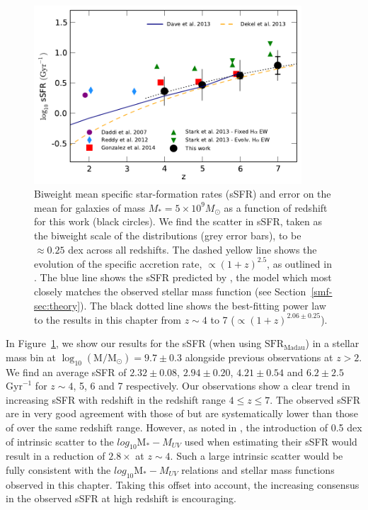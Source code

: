 \begin{figure}
\centering
\includegraphics[width=100mm]{plots/fig13.pdf}
\caption[Biweight mean specific star-formation rates (sSFR) and error on the mean for galaxies of mass $M_{*} = 5 \times 10^9 M_{\odot}$ as a function of redshift for this work (black circles).]{Biweight mean specific star-formation rates (sSFR) and error on the mean for galaxies of mass $M_{*} = 5 \times 10^9 M_{\odot}$ as a function of redshift for this work (black circles). We find the scatter in sSFR, taken as the biweight scale of the distributions (grey error bars), to be $\approx 0.25$ dex across all redshifts. The dashed yellow line shows the evolution of the specific accretion rate, $\propto (1 + z)^{2.5}$, as outlined in \citet{Dekel:2013id}. The blue line shows the sSFR predicted by \citet{Dave:2013bf}, the model which most closely matches the observed stellar mass function (see Section~\ref{smf-sec:theory}). The black dotted line shows the best-fitting power law to the results in this chapter from $z \sim 4$ to 7 ($\propto (1 + z)^{2.06 \pm 0.25}$).}
\label{smf-fig:ssfr_evolution}
\end{figure}

In Figure~\ref{smf-fig:ssfr_evolution}, we show our results for the sSFR (when using $\text{SFR}_{\text{Madau}}$) in a stellar mass bin at $\log_{10}(\text{M} / \text{M}_{\odot}) = 9.7 \pm 0.3$ alongside previous observations at $z > 2$. We find an average sSFR of $2.32\pm0.08$, $2.94\pm0.20$, $4.21\pm0.54$ and $6.2\pm2.5$ $\text{Gyr}^{-1}$ for $z\sim 4$, 5, 6 and 7 respectively. Our observations show a clear trend in increasing sSFR with redshift in the redshift range $4 \leq z \leq 7$. The observed sSFR are in very good agreement with those of \citet{2014ApJ...781...34G} but are systematically lower than those of \citet{Stark:2013ix} over the same redshift range. However, as noted in \citet{Stark:2013ix}, the introduction of 0.5 dex of intrinsic scatter to the $log_{10}\text{M}_{*}-M_{UV}$ used when estimating their sSFR would result in a reduction of $2.8\times$ at $z\sim4$. Such a large intrinsic scatter would be fully consistent with the $log_{10}\text{M}_{*}-M_{UV}$ relations and stellar mass functions observed in this chapter. Taking this offset into account, the increasing consensus in the observed sSFR at high redshift is encouraging.
 
